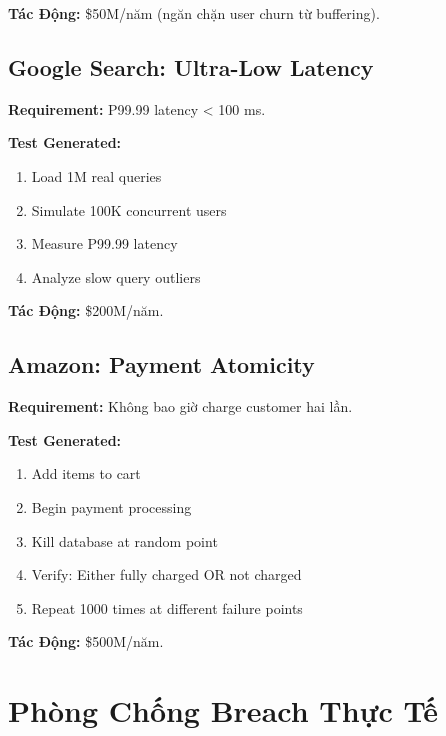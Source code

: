 \documentclass[12pt,oneside]{report}
\begin{document}
\textbf{Tác Động:} \$50M/năm (ngăn chặn user churn từ buffering).

\subsection{Google Search: Ultra-Low Latency}

\textbf{Requirement:} P99.99 latency < 100 ms.

\textbf{Test Generated:}
\begin{enumerate}
    \item Load 1M real queries
    \item Simulate 100K concurrent users
    \item Measure P99.99 latency
    \item Analyze slow query outliers
\end{enumerate}

\textbf{Tác Động:} \$200M/năm.

\subsection{Amazon: Payment Atomicity}

\textbf{Requirement:} Không bao giờ charge customer hai lần.

\textbf{Test Generated:}
\begin{enumerate}
    \item Add items to cart
    \item Begin payment processing
    \item Kill database at random point
    \item Verify: Either fully charged OR not charged
    \item Repeat 1000 times at different failure points
\end{enumerate}

\textbf{Tác Động:} \$500M/năm.

\section{Phòng Chống Breach Thực Tế}
\end{document}
